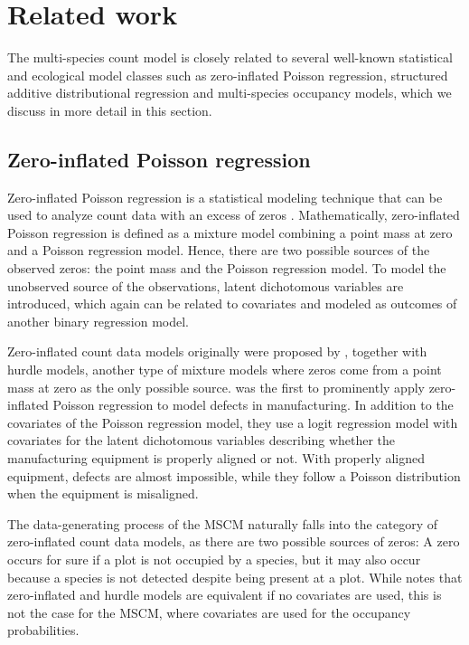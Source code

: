 \documentclass{article}
\begin{document}
\section{Related work}
\label{sec:related}

The multi-species count model is closely related to several well-known statistical and ecological model classes such as zero-inflated Poisson regression, structured additive distributional regression and multi-species occupancy models, which we discuss in more detail in this section.

\subsection{Zero-inflated Poisson regression}

Zero-inflated Poisson regression is a statistical modeling technique that can be used to analyze count data with an excess of zeros \citep{cameronRegression2013}. Mathematically, zero-inflated Poisson regression is defined as a mixture model combining a point mass at zero and a Poisson regression model. Hence, there are two possible sources of the observed zeros: the point mass and the Poisson regression model. To model the unobserved source of the observations, latent dichotomous variables are introduced, which again can be related to covariates and modeled as outcomes of another binary regression model.

Zero-inflated count data models originally were proposed by \citet{mullahySpecification1986}, together with hurdle models, another type of mixture models where zeros come from a point mass at zero as the only possible source. \citet{lambertZeroInflated1992} was the first to prominently apply zero-inflated Poisson regression to model defects in manufacturing. In addition to the covariates of the Poisson regression model, they use a logit regression model with covariates for the latent dichotomous variables describing whether the manufacturing equipment is properly aligned or not. With properly aligned equipment, defects are almost impossible, while they follow a Poisson distribution when the equipment is misaligned.

The data-generating process of the MSCM naturally falls into the category of zero-inflated count data models, as there are two possible sources of zeros: A zero occurs for sure if a plot is not occupied by a species, but it may also occur because a species is not detected despite being present at a plot. While \citet{mullahySpecification1986} notes that zero-inflated and hurdle models are equivalent if no covariates are used, this is not the case for the MSCM, where covariates are used for the occupancy probabilities.
\end{document}
